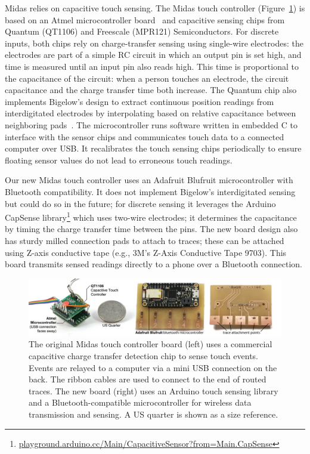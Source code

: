         Midas relies on capacitive touch sensing. The Midas touch controller (Figure~\ref{fig:midas-microcontroller}) is based on an Atmel microcontroller board~\cite{teensy} and capacitive sensing chips from Quantum (QT1106) and Freescale (MPR121) Semiconductors. For discrete inputs, both chips rely on charge-transfer sensing using single-wire electrodes: the electrodes are part of a simple RC circuit in which an output pin is set high, and time is measured until an input pin also reads high. This time is proportional to the capacitance of the circuit: when a person touches an electrode, the circuit capacitance and the charge transfer time both increase. The Quantum chip also implements Bigelow's design to extract continuous position readings from interdigitated electrodes by interpolating based on relative capacitance between neighboring pads~\cite{bigelow-interdigitated}. The microcontroller runs software written in embedded C to interface with the sensor chips and communicates touch data to a connected computer over USB. It recalibrates the touch sensing chips periodically to ensure floating sensor values do not lead to erroneous touch readings.
        
        Our new Midas touch controller uses an Adafruit Blufruit microcontroller with Bluetooth compatibility. It does not implement Bigelow's interdigitated sensing but could do so in the future; for discrete sensing it leverages the Arduino CapSense library\footnote{\url{playground.arduino.cc/Main/CapacitiveSensor?from=Main.CapSense}} which uses two-wire electrodes; it determines the capacitance by timing the charge transfer time between the pins. The new board design also has sturdy milled connection pads to attach to traces; these can be attached using Z-axis conductive tape (e.g., 3M's Z-Axis Conductive Tape 9703). This board transmits sensed readings directly to a phone over a Bluetooth connection.
        
        \begin{figure}[b]
        \centering
\includegraphics[width=6in]{figures/midas/microcontrollerz.jpg}
\caption{The original Midas touch controller board (left) uses a commercial capacitive charge transfer detection chip to sense touch events. Events are relayed to a computer via a mini USB connection on the back. The ribbon cables are used to connect to the end of routed traces. The new board (right) uses an Arduino touch sensing library and a Bluetooth-compatible microcontroller for wireless data transmission and sensing. A US quarter is shown as a size reference.} 
\label{fig:midas-microcontroller}
\end{figure}

